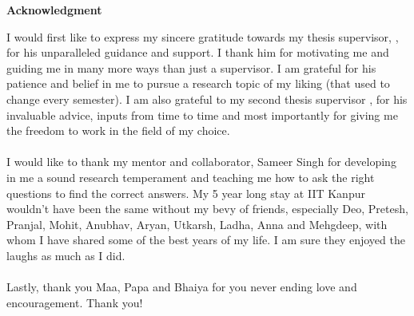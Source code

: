 \begin{center}
	{\huge{\textbf{Acknowledgment}}}
\end{center}
I would first like to express my sincere gratitude towards my thesis supervisor, {\advisormain}, for his unparalleled guidance and support. I thank him for motivating me and guiding me in many more ways than just a supervisor. I am grateful for his patience and belief in me to pursue a research topic of my liking (that used to change every semester). I am also grateful to my second thesis supervisor {\advisorsec}, for his invaluable advice, inputs from time to time and most importantly for giving me the freedom to work in the field of my choice.

\paragraph*{}
I would like to thank my mentor and collaborator, Sameer Singh for developing in me a sound research temperament and teaching me how to ask the right questions to find the correct answers. 
My 5 year long stay at IIT Kanpur wouldn't have been the same without my bevy of friends, especially Deo, Pretesh, Pranjal, Mohit, Anubhav, Aryan, Utkarsh, Ladha, Anna and Mehgdeep, with whom I have shared some of the best years of my life. I am sure they enjoyed the laughs as much as I did.

\paragraph*{}
Lastly, thank you Maa, Papa and Bhaiya for you never ending love and encouragement. Thank you!

\vskip 4mm
\begin{flushright}
\textit{\textbf{\author}}
\end{flushright}




